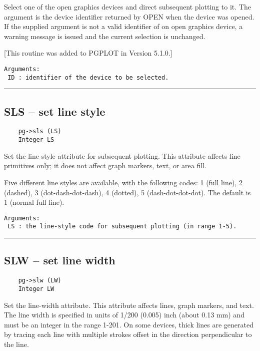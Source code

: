 Select one of the open graphics devices and direct subsequent plotting
to it.  The argument is the device identifier returned by OPEN when
the device was opened.  If the supplied argument is not a valid
identifier of on open graphics device, a warning message is issued and
the current selection is unchanged.

[This routine was added to PGPLOT in Version 5.1.0.]

\begin{verbatim}
Arguments:
 ID : identifier of the device to be selected.
\end{verbatim}

\hrule

\subsection*{SLS -- set line style }

\begin{verbatim}
    pg->sls (LS)
    Integer LS
\end{verbatim}

Set the line style attribute for subsequent plotting.  This attribute
affects line primitives only; it does not affect graph markers, text,
or area fill.

Five different line styles are available, with the following codes: 
1 (full line), 2 (dashed), 3 (dot-dash-dot-dash), 4 (dotted),
5 (dash-dot-dot-dot).  The default is 1 (normal full line).

\begin{verbatim}
Arguments:
 LS : the line-style code for subsequent plotting (in range 1-5). 
\end{verbatim}

\hrule

\subsection*{SLW -- set line width }

\begin{verbatim}
    pg->slw (LW)
    Integer LW
\end{verbatim}

Set the line-width attribute.  This attribute affects lines, graph
markers, and text.  The line width is specified in units of 1/200
(0.005) inch (about 0.13 mm) and must be an integer in the range
1-201.  On some devices, thick lines are generated by tracing each
line with multiple strokes offset in the direction perpendicular to
the line.

